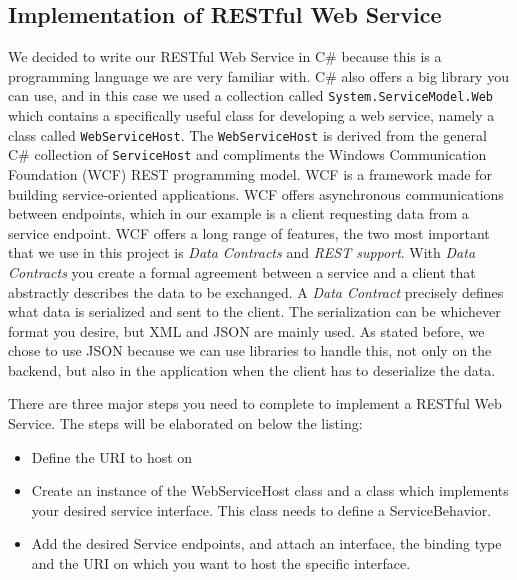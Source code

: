\subsection{Implementation of RESTful Web Service}
\label{subsec:restImpl}

We decided to write our RESTful Web Service in C\# because this is a programming language we are very familiar with. C\# also offers a big library you can use, and in this case we used a collection called \texttt{System.ServiceModel.Web} which contains a specifically useful class for developing a web service, namely a class called \texttt{WebServiceHost}. The \texttt{WebServiceHost} is derived from the general C\# collection of \texttt{ServiceHost} and compliments the Windows Communication Foundation (WCF) REST programming model\cite{WebServiceHost}.
WCF is a framework made for building service-oriented applications. WCF offers asynchronous communications between endpoints, which in our example is a client requesting data from a service endpoint. WCF offers a long range of features, the two most important that we use in this project is \textit{Data Contracts} and \textit{REST support}\cite{WCF}. 
With \textit{Data Contracts} you create a formal agreement between a service and a client that abstractly describes the data to be exchanged. A \textit{Data Contract} precisely defines what data is serialized and sent to the client. The serialization can be whichever format you desire, but XML and JSON are mainly used. As stated before, we chose to use JSON because we can use libraries to handle this, not only on the backend, but also in the application when the client has to deserialize the data.

There are three major steps you need to complete to implement a RESTful Web Service. The steps will be elaborated on below the listing:
\begin{itemize}
\item Define the URI to host on
\item Create an instance of the WebServiceHost class and a class which implements your desired service interface. This class needs to define a ServiceBehavior.
\item Add the desired Service endpoints, and attach an interface, the binding type and the URI on which you want to host the specific interface.
\end{itemize}

